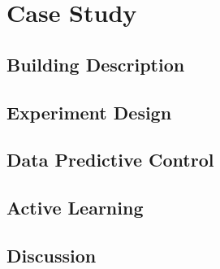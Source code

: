 \section{Case Study}
\label{S:casestudy}


\subsection{Building Description}

\subsection{Experiment Design}

\subsection{Data Predictive Control}

\subsection{Active Learning}

\subsection{Discussion}


